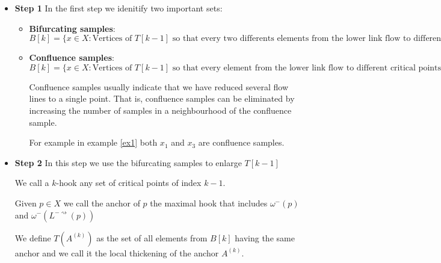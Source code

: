\begin{itemize}

    \item {\bf Step 1}
        In the first step we idenitify two important sets:
        
        \begin{itemize}
            \item {\bf Bifurcating samples}: 
                $
                B[k]
                =\{
                    x\in X: \text{
                        Vertices of } T[k-1] \text{ so that every two differents elements
                        from the lower link flow to different critical points
                    }
                \}
                $
            \item {\bf Confluence samples}: 
                $
                B[k]
                =\{
                    x\in X: \text{
                        Vertices of } T[k-1] \text{ so that every element
                        from the lower link flow to different critical points
                    }
                \}
                $

                Confluence samples usually indicate that we have reduced several flow lines
                to a single point. That is, confluence samples can be eliminated by increasing the number of samples in a neighbourhood of the confluence
                sample.

                For example in example \ref{ex1} both $x_1$ and $x_3$ are confluence samples.
        \end{itemize}


    \item {\bf Step 2}
        In this step we use the bifurcating samples to enlarge $T[k-1]$

        \begin{definition}
            We call a $k$-hook any set of critical points of index $k-1$.

            Given $p\in X$ we call the anchor of $p$ the maximal hook that includes
            $\omega^-(p)$
            and
            $\omega^-(
                L^{-\rightsquigarrow}(p)
            )$
        \end{definition}


        \begin{definition}
            We define $T(A^{(k)})$ as the set of all elements from $B[k]$ having the same anchor
            and we call it the local thickening of the anchor $A^{(k)}$.       



\end{definition}
\end{itemize}
